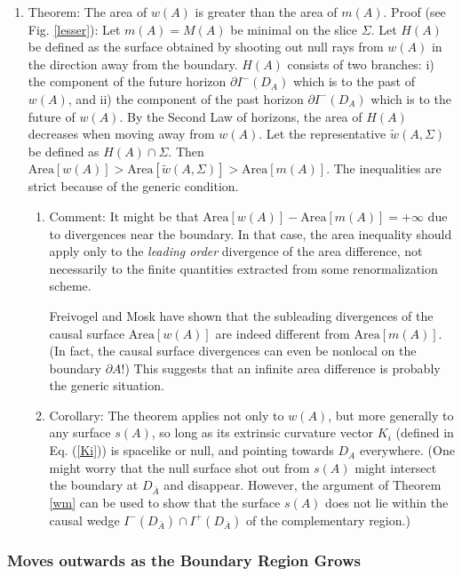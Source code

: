 \documentclass[12pt]{article}
\begin{document}
\begin{enumerate}[resume]
\item Theorem: The area of $w(A)$ is greater than the area of $m(A)$.  Proof (see Fig. \ref{lesser}): Let $m(A) = M(A)$ be minimal on the slice $\Sigma$.  Let $H(A)$ be defined as the surface obtained by shooting out null rays from $w(A)$ in the direction away from the boundary.  $H(A)$ consists of two branches: i) the component of the future horizon $\partial I^-(D_A)$ which is to the past of $w(A)$, and ii) the component of the past horizon $\partial I^-(D_A)$ which is to the future of $w(A)$.  By the Second Law of horizons, the area of $H(A)$ decreases when moving away from $w(A)$.  Let the representative $\tilde{w}(A, \Sigma)$ be defined as $H(A) \cap \Sigma$.  Then $\mathrm{Area}[w(A)] > \mathrm{Area}[\tilde{w}(A, \Sigma)] > \mathrm{Area}[m(A)]$.  The inequalities are strict because of the generic condition.
	\begin{enumerate}
	\item Comment: It might be that $\mathrm{Area}[w(A)] - \mathrm{Area}[m(A)] = +\infty$ due to divergences near the boundary.  In that case, the area inequality should apply only to the \emph{leading order} divergence of the area difference, not necessarily to the finite quantities extracted from some renormalization scheme.

Freivogel and Mosk \cite{FM13} have shown that the subleading divergences of the causal surface $\mathrm{Area}[w(A)]$ are indeed different from $\mathrm{Area}[m(A)]$.  (In fact, the causal surface divergences can even be nonlocal on the boundary $\partial A$!)  This suggests that an infinite area difference is probably the generic situation.

	\item Corollary: The theorem applies not only to $w(A)$, but more generally to any surface $s(A)$, so long as its extrinsic curvature vector $K_i$ (defined in Eq. (\ref{Ki})) is spacelike or null, and pointing towards $D_A$ everywhere.  (One might worry that the null surface shot out from $s(A)$ might intersect the boundary at $D_{\bar{A}}$ and disappear.  However, the argument of Theorem \ref{wm} can be used to show that the surface $s(A)$ does not lie within the causal wedge
$I^-(D_{\bar{A}}) \cap I^+(D_{\bar{A}})$ of the complementary region.)
	\end{enumerate}
\end{enumerate}

\subsubsection{Moves outwards as the Boundary Region Grows}\label{GROW}
\end{document}
